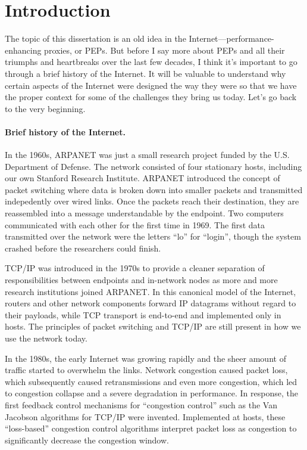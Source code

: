 \chapter{Introduction}
\label{sec:introduction}

The topic of this dissertation is an old idea in the
Internet---performance-enhancing proxies, or PEPs. But before I say more about
PEPs and all their triumphs and heartbreaks over the last few decades, I think
it's important to go through a brief history of the Internet. It will be
valuable to understand why certain aspects of the Internet were designed the
way they were so that we have the proper context for some of the challenges
they bring us today. Let's go back to the very beginning.

\subsubsection{Brief history of the Internet.}

In the 1960s, ARPANET was just a small research project funded by the U.S.
Department of Defense. The network consisted of four stationary hosts,
including our own Stanford Research Institute. ARPANET introduced the concept
of packet switching where data is broken down into smaller packets and
transmitted indepedently over wired links. Once the packets reach their
destination, they are reassembled into a message understandable by the
endpoint. Two computers communicated with each other for the first time in
1969. The first data transmitted over the network were the letters ``lo'' for
``login'', though the system crashed before the researchers could finish.

TCP/IP was introduced in the 1970s to provide a cleaner separation of
responsibilities between endpoints and in-network nodes as more and more
research institutions joined ARPANET. In this canonical model of the Internet,
routers and other network components forward IP datagrams without regard to
their payloads, while TCP transport is end-to-end and implemented only in
hosts. The principles of packet switching and TCP/IP are still present in how
we use the network today.

In the 1980s, the early Internet was growing rapidly and the sheer amount of
traffic started to overwhelm the links. Network congestion caused packet loss,
which subsequently caused retransmissions and even more congestion, which led
to congestion collapse and a severe degradation in performance. In response,
the first feedback control mechanisms for ``congestion control'' such as the
Van Jacobson algorithms for TCP/IP were invented. Implemented at hosts, these
``loss-based'' congestion control algorithms interpret packet loss as
congestion to significantly decrease the congestion window.

